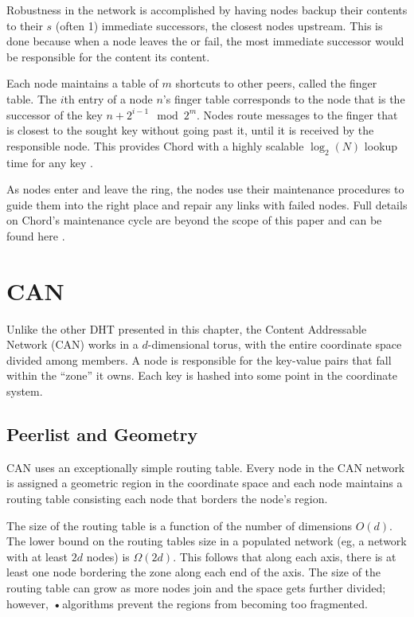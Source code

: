 \documentclass[10pt,letterpaper]{report}
\begin{document}
Robustness in the network is accomplished by having nodes backup their contents to their $s$ (often 1) immediate successors, the closest nodes upstream.  
This is done because when a node leaves the or fail, the most immediate successor would be responsible for the content its content.

Each node maintains a table of $m$ shortcuts to other peers, called the finger table.   The $i$th entry of a node $n$'s finger table corresponds to the node that is the successor of the key $n+2^{i-1} \mod 2^m $.  Nodes route messages to the finger that is closest to the sought key without going past it, until it is received by the responsible node.  This provides Chord with a highly scalable $\log_2(N)$ lookup time for any key \cite{chord}.

As nodes enter and leave the ring, the nodes use their maintenance procedures to guide them into the right place and repair any links with failed nodes.  Full details on Chord's maintenance cycle are beyond the scope of this paper and can be found here \cite{chord}.


\section{CAN}
Unlike the other DHT presented in this chapter, the Content Addressable Network (CAN) \cite{can} works in a $d$-dimensional torus, with the entire coordinate space divided among members.
A node is responsible for the key-value pairs that fall within the ``zone'' it owns.
Each key is hashed into some point in the coordinate system.

\subsection*{Peerlist and Geometry}
CAN uses an exceptionally simple routing table.  
Every node in the CAN network is assigned a geometric region in the coordinate space and each node maintains a routing table consisting each node that borders the node's region.

The size of the routing table is a function of the number of dimensions $O(d)$. 
The lower bound on the routing tables size in a populated network (eg, a network with at least $2d$ nodes) is $\Omega(2d)$.  
This follows that along each axis, there is at least one node bordering the zone along each end of the axis.
The size of the routing table can grow as more nodes join and the space gets further divided; however, \textbf{•}algorithms prevent the regions from becoming too fragmented.
\end{document}

